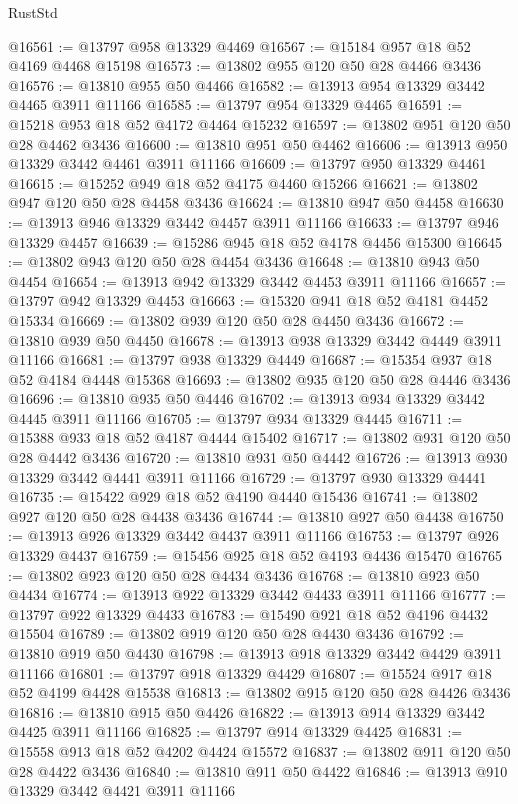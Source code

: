 \begin{lexlean}{RustStd}
\begin{coremodule}
@16561 := @13797 @958 @13329 @4469
@16567 := @15184 @957 @18 @52 @4169 @4468 @15198
@16573 := @13802 @955 @120 @50 @28 @4466 @3436
@16576 := @13810 @955 @50 @4466
@16582 := @13913 @954 @13329 @3442 @4465 @3911 @11166
@16585 := @13797 @954 @13329 @4465
@16591 := @15218 @953 @18 @52 @4172 @4464 @15232
@16597 := @13802 @951 @120 @50 @28 @4462 @3436
@16600 := @13810 @951 @50 @4462
@16606 := @13913 @950 @13329 @3442 @4461 @3911 @11166
@16609 := @13797 @950 @13329 @4461
@16615 := @15252 @949 @18 @52 @4175 @4460 @15266
@16621 := @13802 @947 @120 @50 @28 @4458 @3436
@16624 := @13810 @947 @50 @4458
@16630 := @13913 @946 @13329 @3442 @4457 @3911 @11166
@16633 := @13797 @946 @13329 @4457
@16639 := @15286 @945 @18 @52 @4178 @4456 @15300
@16645 := @13802 @943 @120 @50 @28 @4454 @3436
@16648 := @13810 @943 @50 @4454
@16654 := @13913 @942 @13329 @3442 @4453 @3911 @11166
@16657 := @13797 @942 @13329 @4453
@16663 := @15320 @941 @18 @52 @4181 @4452 @15334
@16669 := @13802 @939 @120 @50 @28 @4450 @3436
@16672 := @13810 @939 @50 @4450
@16678 := @13913 @938 @13329 @3442 @4449 @3911 @11166
@16681 := @13797 @938 @13329 @4449
@16687 := @15354 @937 @18 @52 @4184 @4448 @15368
@16693 := @13802 @935 @120 @50 @28 @4446 @3436
@16696 := @13810 @935 @50 @4446
@16702 := @13913 @934 @13329 @3442 @4445 @3911 @11166
@16705 := @13797 @934 @13329 @4445
@16711 := @15388 @933 @18 @52 @4187 @4444 @15402
@16717 := @13802 @931 @120 @50 @28 @4442 @3436
@16720 := @13810 @931 @50 @4442
@16726 := @13913 @930 @13329 @3442 @4441 @3911 @11166
@16729 := @13797 @930 @13329 @4441
@16735 := @15422 @929 @18 @52 @4190 @4440 @15436
@16741 := @13802 @927 @120 @50 @28 @4438 @3436
@16744 := @13810 @927 @50 @4438
@16750 := @13913 @926 @13329 @3442 @4437 @3911 @11166
@16753 := @13797 @926 @13329 @4437
@16759 := @15456 @925 @18 @52 @4193 @4436 @15470
@16765 := @13802 @923 @120 @50 @28 @4434 @3436
@16768 := @13810 @923 @50 @4434
@16774 := @13913 @922 @13329 @3442 @4433 @3911 @11166
@16777 := @13797 @922 @13329 @4433
@16783 := @15490 @921 @18 @52 @4196 @4432 @15504
@16789 := @13802 @919 @120 @50 @28 @4430 @3436
@16792 := @13810 @919 @50 @4430
@16798 := @13913 @918 @13329 @3442 @4429 @3911 @11166
@16801 := @13797 @918 @13329 @4429
@16807 := @15524 @917 @18 @52 @4199 @4428 @15538
@16813 := @13802 @915 @120 @50 @28 @4426 @3436
@16816 := @13810 @915 @50 @4426
@16822 := @13913 @914 @13329 @3442 @4425 @3911 @11166
@16825 := @13797 @914 @13329 @4425
@16831 := @15558 @913 @18 @52 @4202 @4424 @15572
@16837 := @13802 @911 @120 @50 @28 @4422 @3436
@16840 := @13810 @911 @50 @4422
@16846 := @13913 @910 @13329 @3442 @4421 @3911 @11166

\end{coremodule}
\end{lexlean}
